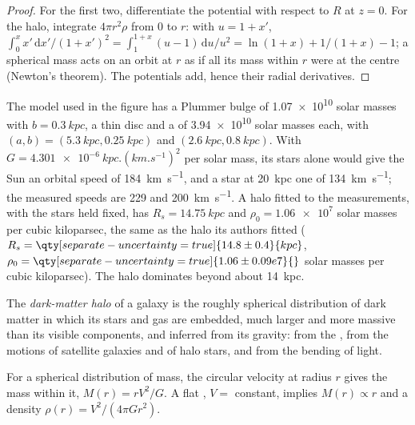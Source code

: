 \begin{proof}
For the first two, differentiate the potential with respect to $R$ at
$z = 0$. For the halo, integrate $4\pi r^2\rho$ from 0 to $r$: with
$u = 1 + x'$, $\int_0^x x'\,\mathrm{d}x'/(1 + x')^2 =
\int_1^{1+x}(u - 1)\,\mathrm{d}u/u^2 = \ln(1 + x) + 1/(1 + x) - 1$; a
spherical mass acts on an orbit at $r$ as if all its mass within $r$ were
at the centre (Newton's theorem). The potentials add, hence their radial
derivatives.
\end{proof}

The model used in the figure has a Plummer bulge of
\num{1.07e10} solar masses with $b = \qty{0.3}{kpc}$, a thin disc and a
 of \num{3.94e10} solar masses each, with $(a, b) =
(\qty{5.3}{kpc}, \qty{0.25}{kpc})$ and $(\qty{2.6}{kpc}, \qty{0.8}{kpc})$.
With $G = \qty{4.301e-6}{kpc.(km.s^{-1})^2}$ per solar mass, its stars
alone would give the Sun an orbital speed of \qty{184}{km.s^{-1}}, and a
star at \qty{20}{kpc} one of \qty{134}{km.s^{-1}}; the measured speeds are
229 and \qty{200}{km.s^{-1}}. A halo fitted to the measurements, with the
stars held fixed, has $R_s = \qty{14.75}{kpc}$ and
$\rho_0 = \num{1.06e7}$ solar masses per cubic kiloparsec, the same as
the halo its authors fitted ($R_s = \qty[separate-uncertainty=true]{14.8 \pm 0.4}{kpc}$,
$\rho_0 = \qty[separate-uncertainty=true]{1.06 \pm 0.09 e7}{}$ solar masses
per cubic kiloparsec). The halo dominates beyond about \qty{14}{kpc}.

\begin{definition}\label{def:b3:milky-way-galaxies:halo}
The \emph{dark-matter halo} of a galaxy is the
roughly spherical distribution of dark matter in which its stars and gas
are embedded, much larger and more massive than its visible components,
and inferred from its gravity: from the , from the motions
of satellite galaxies and of halo stars, and from the bending of light.
\end{definition}

\begin{theorem}\label{thm:b3:milky-way-galaxies:enclosed}
For a spherical distribution of mass, the circular velocity at radius $r$
gives the mass within it, $M(r) = rV^2/G$. A flat ,
$V = $ constant, implies $M(r) \propto r$ and a density
$\rho(r) = V^2/(4\pi G r^2)$.
\end{theorem}

